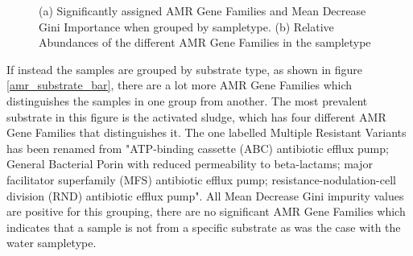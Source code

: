 \begin{figure}[h]
    \centering
    \caption{(a) Significantly assigned AMR Gene Families and Mean Decrease Gini Importance when grouped by sampletype. (b) Relative Abundances of the different AMR Gene Families in the sampletype}
    \label{amr_sampletype}
\end{figure}

If instead the samples are grouped by substrate type, as shown in figure \ref{amr_substrate_bar}, there are a lot more AMR Gene Families which distinguishes the samples in one group from another.
The most prevalent substrate in this figure is the activated sludge, which has four different AMR Gene Families that distinguishes it.
The one labelled Multiple Resistant Variants has been renamed from "ATP-binding cassette (ABC) antibiotic efflux pump; General Bacterial Porin with reduced permeability to beta-lactams; major facilitator superfamily (MFS) antibiotic efflux pump; resistance-nodulation-cell division (RND) antibiotic efflux pump". 
All Mean Decrease Gini impurity values are positive for this grouping, there are no significant AMR Gene Families which indicates that a sample is not from a specific substrate as was the case with the water sampletype. 

